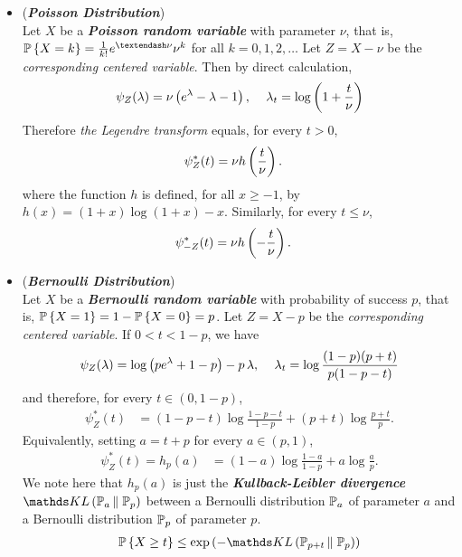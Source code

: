 \documentclass[11pt]{article}
\begin{document}
\begin{itemize}
\item \begin{example} (\emph{\textbf{Poisson Distribution}})\\
Let $X$ be a \emph{\textbf{Poisson random variable}} with parameter $\nu$, that is, $\bP\set{X = k} = \frac{1}{k!}e^{–\nu}\nu^k$ for all $k = 0, 1, 2, \ldots$ Let $Z = X - \nu$ be the \emph{corresponding centered variable}. Then by direct calculation,
\begin{align*}
\psi_Z(\lambda) = \nu\left(e^{\lambda} - \lambda - 1 \right),\, \quad \lambda_t = \log\left(1 + \frac{t}{\nu}\right)
\end{align*} Therefore \emph{the Legendre transform} equals, for every $t > 0$,
\begin{align*}
\psi_{Z}^{*}(t) &= \nu h\left(\frac{t}{\nu}\right).
\end{align*} where the function $h$ is defined, for all  $x \ge -1$, by $h(x) = (1 + x) \log(1 + x) - x$. Similarly,
for every $t \le \nu$,
\begin{align*}
\psi_{-Z}^{*}(t) &= \nu h\left(-\frac{t}{\nu}\right).
\end{align*} 
\end{example}


\item \begin{example} (\emph{\textbf{Bernoulli Distribution}})\\
Let $X$ be  a \emph{\textbf{Bernoulli random variable}} with probability of success $p$, that is, ${\mathbb P}\left\{X = 1\right\} = 1- {\mathbb P}\left\{X =0\right\} = p$. Let $Z = X -  p$ be the \emph{corresponding centered variable}. If $0 < t < 1 - p$, we have
\begin{align*}
\psi_Z(\lambda) = \log\left(p e^{\lambda} + 1 - p \right) - p \,\lambda ,\, \quad \lambda_t = \log \frac{(1-p)(p + t)}{p(1 - p - t)}
\end{align*} and therefore, for every $t \in (0, 1 - p)$,
\begin{align*}
\psi_{Z}^{*}(t) &= (1-p-t)\log\frac{1 - p - t}{1 - p} + (p + t)\log \frac{p + t}{p}.
\end{align*} Equivalently, setting $a = t + p$ for every $a \in (p, 1)$,
\begin{align*}
\psi_{Z}^{*}(t) = h_p(a)&= (1- a)\log\frac{1- a}{1 - p} + a \log\frac{a}{p}.
\end{align*}  We note here that $h_p(a)$ is just the \emph{\textbf{Kullback-Leibler divergence}} $\kl{\bP_a}{\bP_p}$ between a Bernoulli distribution ${\mathbb P}_a$ of parameter $a$ and a Bernoulli distribution ${\mathbb P}_p$ of parameter $p$. 
\begin{align*}
\bP\set{X \ge t} \le \exp\paren{- \kl{\bP_{p+t}}{\bP_p}}
\end{align*}
\end{example}
\end{itemize}
\end{document}
